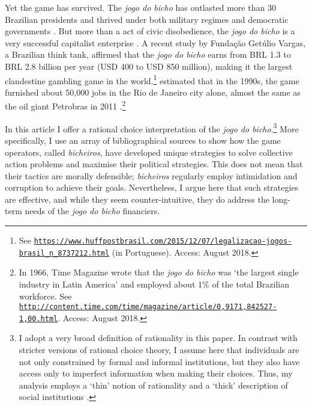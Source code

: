 \documentclass[a4paper,12pt]{article}
\begin{document}
Yet the game has survived. The \textit{jogo do bicho} has outlasted more than 30 Brazilian presidents and thrived under both military regimes and democratic governments \citep{jupiara2015poroes}. But more than a act of civic disobedience, the \textit{jogo do bicho} is a very successful capitalist enterprise \citep{labronici2014sorteio, magalhaes2005ganhou}. A recent study by Fundação Getúlio Vargas, a Brazilian think tank, affirmed that the \textit{jogo do bicho} earns from BRL 1.3 to BRL 2.8 billion per year (USD 400 to USD 850 million), making it the largest clandestine gambling game in the world.\footnote{See \href{https://www.huffpostbrasil.com/2015/12/07/legalizacao-jogos-brasil_n_8737212.html}{\texttt{https://www.huffpostbrasil.com/2015/12/07/legalizacao-jogos-brasil\_n\_8737212.html}} (in Portuguese). Access: August 2018.} \citet[171]{schneider1996brazil} estimated that in the 1990s, the game furnished about 50,000 jobs in the Rio de Janeiro city alone, almost the same as the oil giant Petrobras in 2011 \citep{exame2016petrobras}.\footnote{In 1966, Time Magazine wrote that the \textit{jogo do bicho} was `the largest single industry in Latin America' and employed about 1\% of the total Brazilian workforce. See \href{http://content.time.com/time/magazine/article/0,9171,842527-1,00.html}{\texttt{http://content.time.com/time/magazine/article/0,9171,842527-1,00.html}}. Access: August 2018.}

In this article I offer a rational choice interpretation of the \textit{jogo do bicho}.\footnote{I adopt a very broad definition of rationality in this paper. In contrast with stricter versions of rational choice theory, I assume here that individuals are not only constrained by formal and informal institutions, but they also have access only to imperfect information when making their choices. Thus, my analysis employs a `thin' notion of rationality and a `thick' description of social institutions \citep[253]{boettke2001calculation}.} More specifically, I use an array of bibliographical sources to show how the game operators, called \textit{bicheiros}, have developed unique strategies to solve collective action problems and maximise their political strategies. This does not mean that their tactics are morally defensible; \textit{bicheiros} regularly employ intimidation and corruption to achieve their goals. Nevertheless, I argue here that such strategies are effective, and while they seem counter-intuitive, they do address the long-term needs of the \textit{jogo do bicho} financiers. 
\end{document}
